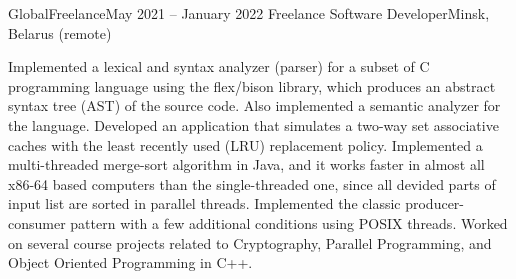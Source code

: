 
\begin{cvHeadingList}

  \cvCustomHeading
    {GlobalFreelance}{May 2021 – January 2022}
    {Freelance Software Developer}{Minsk, Belarus (remote)} %

  \begin{cvList}
    \cvItem Implemented a lexical and syntax analyzer (parser) for a subset of
      C programming language using the flex/bison library, which produces an
      abstract syntax tree (AST) of the source code. Also implemented a semantic
      analyzer for the language.
    \cvItem Developed an application that simulates a two-way set associative
      caches with the least recently used (LRU) replacement policy.
    \cvItem Implemented a multi-threaded merge-sort algorithm in Java, and it
      works faster in almost all x86-64 based computers than the single-threaded
      one, since all devided parts of input list are sorted in parallel threads.
    \cvItem Implemented the classic producer-consumer pattern with a few
      additional conditions using POSIX threads.
    \cvItem Worked on several course projects related to Cryptography, Parallel
      Programming, and Object Oriented Programming in C++.
  \end{cvList}

\end{cvHeadingList}
